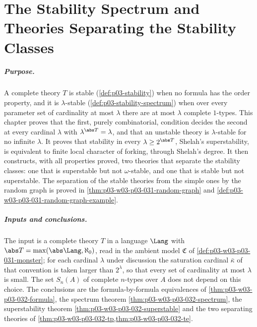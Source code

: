 \chapter{The Stability Spectrum and Theories Separating the Stability Classes}
\label{sec:p03-w03-p03-032-spectrum}

\paragraph{Purpose.}
A complete theory \(T\) is stable (\cref{def:p03-stability}) when no
formula has the order property, and it is \(\lambda\)-stable
(\cref{def:p03-stability-spectrum}) when over every parameter set of
cardinality at most \(\lambda\) there are at most \(\lambda\) complete
\(1\)-types.  This chapter proves that the first, purely combinatorial,
condition decides the second at every cardinal \(\lambda\) with
\(\lambda^{\abs T}=\lambda\), and that an unstable theory is
\(\lambda\)-stable for no infinite \(\lambda\).  It proves that stability in
every \(\lambda\geq2^{\abs T}\), Shelah's superstability, is equivalent to
finite local character of forking, through Shelah's degree.  It then constructs, with all
properties proved, two theories that separate the stability classes: one that
is superstable but not \(\omega\)-stable, and one that is stable but not
superstable.  The separation of the stable theories from the simple ones by
the random graph is proved in \cref{thm:p03-w03-p03-031-random-graph} and
\cref{def:p03-w03-p03-031-random-graph-example}.

\paragraph{Inputs and conclusions.}
The input is a complete theory \(T\) in a language \(\Lang\) with
\(\abs T=\max(\abs\Lang,\aleph_0)\), read in the ambient model
\(\mathfrak C\) of \cref{def:p03-w03-p03-031-monster}; for each cardinal
\(\lambda\) under discussion the saturation cardinal \(\bar\kappa\) of that
convention is taken larger than \(2^\lambda\), so that every set of
cardinality at most \(\lambda\) is small.  The set \(S_n(A)\) of complete
\(n\)-types over \(A\) does not depend on this choice.  The conclusions are
the formula-by-formula equivalences of
\cref{thm:p03-w03-p03-032-formula}, the spectrum theorem
\cref{thm:p03-w03-p03-032-spectrum}, the superstability theorem
\cref{thm:p03-w03-p03-032-superstable} and the two separating theories of
\cref{thm:p03-w03-p03-032-tp,thm:p03-w03-p03-032-te}.

